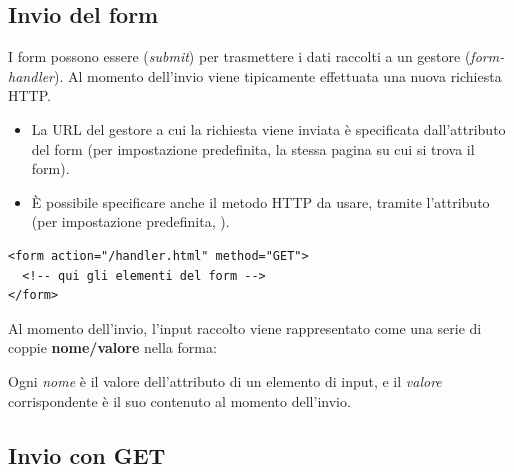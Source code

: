 \subsection{Invio del form}

I form possono essere  (\textit{submit}) per trasmettere i dati
raccolti a un gestore (\textit{form-handler}). Al momento dell'invio viene
tipicamente effettuata una nuova richiesta HTTP.

\begin{itemize}
  \item La URL del gestore a cui la richiesta viene inviata è specificata
        dall'attributo  del form (per impostazione predefinita, la
        stessa pagina su cui si trova il form).
  \item È possibile specificare anche il metodo HTTP da usare, tramite
        l'attributo  (per impostazione predefinita, ).
\end{itemize}

\begin{lstlisting}[style=html]
<form action="/handler.html" method="GET">
  <!-- qui gli elementi del form -->
</form>
\end{lstlisting}

Al momento dell'invio, l'input raccolto viene rappresentato come una serie di
coppie \textbf{nome/valore} nella forma:

\begin{center}
\end{center}

Ogni \textit{nome} è il valore dell'attributo  di un elemento di
input, e il \textit{valore} corrispondente è il suo contenuto al momento
dell'invio.


\subsection{Invio con GET}

